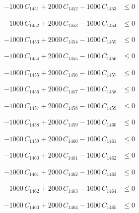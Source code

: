 \documentclass[a4paper,11pt]{article}
\begin{document}
\begin{align}
-1000\,C_{1451} + 2000\,C_{1452} - 1000\,C_{1453} &\leq 0 \nonumber
\end{align}

\begin{align}
-1000\,C_{1452} + 2000\,C_{1453} - 1000\,C_{1454} &\leq 0 \nonumber
\end{align}

\begin{align}
-1000\,C_{1453} + 2000\,C_{1454} - 1000\,C_{1455} &\leq 0 \nonumber
\end{align}

\begin{align}
-1000\,C_{1454} + 2000\,C_{1455} - 1000\,C_{1456} &\leq 0 \nonumber
\end{align}

\begin{align}
-1000\,C_{1455} + 2000\,C_{1456} - 1000\,C_{1457} &\leq 0 \nonumber
\end{align}

\begin{align}
-1000\,C_{1456} + 2000\,C_{1457} - 1000\,C_{1458} &\leq 0 \nonumber
\end{align}

\begin{align}
-1000\,C_{1457} + 2000\,C_{1458} - 1000\,C_{1459} &\leq 0 \nonumber
\end{align}

\begin{align}
-1000\,C_{1458} + 2000\,C_{1459} - 1000\,C_{1460} &\leq 0 \nonumber
\end{align}

\begin{align}
-1000\,C_{1459} + 2000\,C_{1460} - 1000\,C_{1461} &\leq 0 \nonumber
\end{align}

\begin{align}
-1000\,C_{1460} + 2000\,C_{1461} - 1000\,C_{1462} &\leq 0 \nonumber
\end{align}

\begin{align}
-1000\,C_{1461} + 2000\,C_{1462} - 1000\,C_{1463} &\leq 0 \nonumber
\end{align}

\begin{align}
-1000\,C_{1462} + 2000\,C_{1463} - 1000\,C_{1464} &\leq 0 \nonumber
\end{align}

\begin{align}
-1000\,C_{1463} + 2000\,C_{1464} - 1000\,C_{1465} &\leq 0 \nonumber
\end{align}
\end{document}

